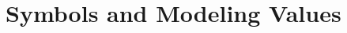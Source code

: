\documentclass[11pt]{article}
\begin{document}
	\section*{Symbols and Modeling Values}
	
	
\end{document}
